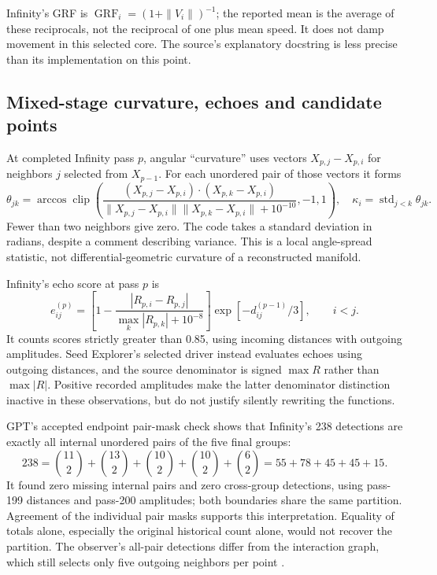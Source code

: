 \documentclass[11pt,a4paper]{article}
\begin{document}
Infinity's GRF is $\operatorname{GRF}_i=(1+\|V_i\|)^{-1}$; the reported mean is the average of these reciprocals, not the reciprocal of one plus mean speed. It does not damp movement in this selected core. The source's explanatory docstring is less precise than its implementation on this point.

\subsection{Mixed-stage curvature, echoes and candidate points}
At completed Infinity pass $p$, angular ``curvature'' uses vectors $X_{p,j}-X_{p,i}$ for neighbors $j$ selected from $X_{p-1}$. For each unordered pair of those vectors it forms
\begin{equation}
\theta_{jk}=\arccos\operatorname{clip}\!\left(
\frac{(X_{p,j}-X_{p,i})\cdot(X_{p,k}-X_{p,i})}
{\|X_{p,j}-X_{p,i}\|\|X_{p,k}-X_{p,i}\|+10^{-10}},-1,1\right),\quad
\kappa_i=\operatorname{std}_{j<k}\theta_{jk}.\label{eq:curv}
\end{equation}
Fewer than two neighbors give zero. The code takes a standard deviation in radians, despite a comment describing variance. This is a local angle-spread statistic, not differential-geometric curvature of a reconstructed manifold.

Infinity's echo score at pass $p$ is
\begin{equation}
e_{ij}^{(p)}=\left[1-\frac{|R_{p,i}-R_{p,j}|}{\max_k|R_{p,k}|+10^{-8}}\right]
\exp[-d_{ij}^{(p-1)}/3],\qquad i<j.\label{eq:echo5}
\end{equation}
It counts scores strictly greater than 0.85, using incoming distances with outgoing amplitudes. Seed Explorer's selected driver instead evaluates echoes using outgoing distances, and the source denominator is signed $\max R$ rather than $\max|R|$. Positive recorded amplitudes make the latter denominator distinction inactive in these observations, but do not justify silently rewriting the functions.

GPT's accepted endpoint pair-mask check shows that Infinity's 238 detections are exactly all internal unordered pairs of the five final groups:
\begin{equation}
238=\binom{11}{2}+\binom{13}{2}+\binom{10}{2}+\binom{10}{2}+\binom{6}{2}
=55+78+45+45+15.\label{eq:238}
\end{equation}
It found zero missing internal pairs and zero cross-group detections, using pass-199 distances and pass-200 amplitudes; both boundaries share the same partition. Agreement of the individual pair masks supports this interpretation. Equality of totals alone, especially the original historical count alone, would not recover the partition. The observer's all-pair detections differ from the interaction graph, which still selects only five outgoing neighbors per point \cite{review5}.
\end{document}
